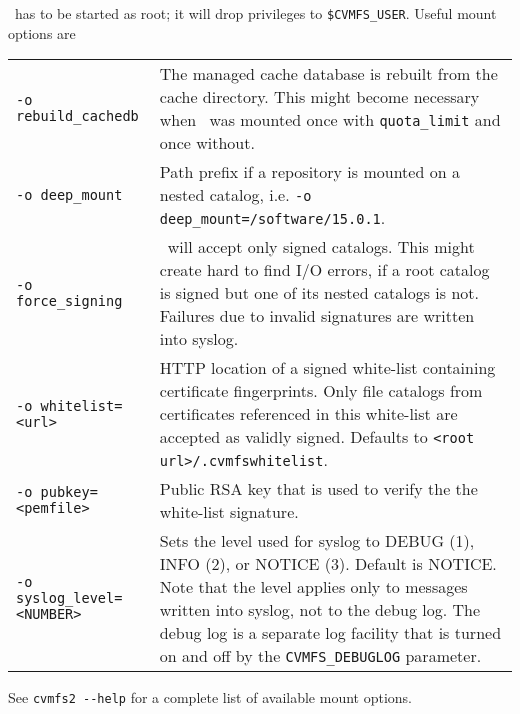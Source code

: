 \cvmfs\ has to be started as root; it will drop privileges to \texttt{\$CVMFS\_USER}.
Useful mount options are\\
\begin{tabularx}{\linewidth}{lX}
	\lstinline{-o rebuild_cachedb} & The managed cache database is rebuilt from the cache directory. This might become necessary when \cvmfs\ was mounted once with \lstinline{quota_limit} and once without. \\
	\lstinline{-o deep_mount} & Path prefix if a repository is mounted on a nested catalog, i.e. \lstinline{-o deep_mount=/software/15.0.1}. \\
	\lstinline{-o force_signing} & \cvmfs\ will accept only signed catalogs.  This might create hard to find I/O errors, if a root catalog is signed but one of its nested catalogs is not.  Failures due to invalid signatures are written into syslog.\\
	\lstinline{-o whitelist=<url>} & HTTP location of a signed white-list containing certificate fingerprints.  Only file catalogs from certificates referenced in this white-list are accepted as validly signed. Defaults to \texttt{<root url>/.cvmfswhitelist}.\\
	\lstinline{-o pubkey=<pemfile>} & Public RSA key that is used to verify the the white-list signature.\\
	\lstinline{-o syslog_level=<NUMBER>} & Sets the level used for syslog to DEBUG (1), INFO (2), or NOTICE (3). Default is NOTICE. Note that the level applies only to messages written into syslog, not to the debug log.  The debug log is a separate log facility that is turned on and off by the \texttt{CVMFS\_DEBUGLOG} parameter.\\
\end{tabularx}
See \lstinline{cvmfs2 --help} for a complete list of available mount options.

